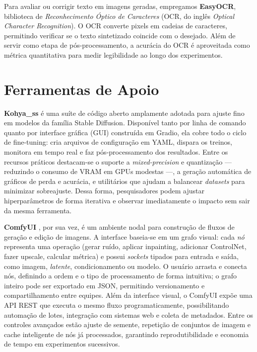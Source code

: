 \documentclass[12pt, %
openright, 
oneside, %
a4paper,    %
brazil]{facom-ufu-abntex2}
\begin{document}
Para avaliar ou corrigir texto em imagens geradas, empregamos \textbf{EasyOCR}, biblioteca de \emph{Reconhecimento Óptico de Caracteres} (OCR, do inglês \emph{Optical Character Recognition}). O OCR converte pixels em cadeias de caracteres, permitindo verificar se o texto sintetizado coincide com o desejado. Além de servir como etapa de pós-processamento, a acurácia do OCR é aproveitada como métrica quantitativa para medir legibilidade ao longo dos experimentos.

\section{Ferramentas de Apoio}

\textbf{Kohya\_ss} \cite{kohya_ss} é uma suíte de código aberto amplamente adotada para ajuste fino em modelos da família Stable Diffusion. Disponível tanto por linha de comando quanto por interface gráfica (GUI) construída em Gradio, ela cobre todo o ciclo de fine-tuning: cria arquivos de configuração em YAML, dispara os treinos, monitora em tempo real e faz pós-processamento dos resultados. Entre os recursos práticos destacam-se o suporte a \emph{mixed-precision} e quantização — reduzindo o consumo de VRAM em GPUs modestas —, a geração automática de gráficos de perda e acurácia, e utilitários que ajudam a balancear \emph{datasets} para minimizar sobreajuste. Dessa forma, pesquisadores podem ajustar hiperparâmetros de forma iterativa e observar imediatamente o impacto sem sair da mesma ferramenta.

\textbf{ComfyUI} \cite{comfyui}, por sua vez, é um ambiente nodal para construção de fluxos de geração e edição de imagens. A interface baseia-se em um grafo visual: cada \emph{nó} representa uma operação (gerar ruído, aplicar inpainting, adicionar ControlNet, fazer upscale, calcular métrica) e possui \emph{sockets} tipados para entrada e saída, como imagem, \emph{latente}, condicionamento ou modelo. O usuário arrasta e conecta nós, definindo a ordem e o tipo de processamento de forma intuitiva; o grafo inteiro pode ser exportado em JSON, permitindo versionamento e compartilhamento entre equipes. Além da interface visual, o ComfyUI expõe uma API REST que executa o mesmo fluxo programaticamente, possibilitando automação de lotes, integração com sistemas web e coleta de metadados. Entre os controles avançados estão ajuste de semente, repetição de conjuntos de imagem e cache inteligente de nós já processados, garantindo reprodutibilidade e economia de tempo em experimentos sucessivos.
\end{document}
